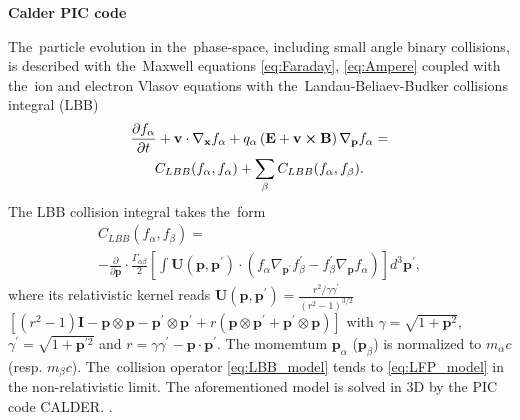 
\textbf{Calder PIC code}

The~particle evolution in the~phase-space, including small angle 
binary collisions, is described with 
the~Maxwell equations \eqref{eq:Faraday}, \eqref{eq:Ampere}
coupled with the~ion and electron Vlasov equations with 
the~Landau-Beliaev-Budker collisions integral (LBB)
\cite{Landau_1936, Beliaev_SPD1956} 
\begin{multline}
\frac{\partial f_\alpha}{\partial t}+\mathbf{v}\cdot\nabla_{\mathbf{x}}f_\alpha+q_\alpha\left(\mathbf{E}+\mathbf{v}\boldsymbol{\times}\mathbf{B}\right)\nabla_{\mathbf{p}}f_\alpha =
\\
C_{LBB}(f_\alpha,f_\alpha)+\sum_\beta C_{LBB}(f_\alpha,f_\beta)
.
\end{multline}
The LBB collision integral takes the~form
\begin{multline}
C_{LBB}(f_\alpha,f_\beta)=
\\
-\frac{\partial}{\partial \mathbf{p}}\cdot\frac{\Gamma_{\alpha\beta}}{2}\left[\int \mathbf{U}(\mathbf{p},\mathbf{p}^\prime)\cdot(f_\alpha\nabla_{\mathbf{p}^\prime}f_\beta^\prime-f_\beta^\prime\nabla_{\mathbf{p}}f_\alpha)\right]d^3\mathbf{p}^\prime
,
\label{eq:LBB_model}
\end{multline}
where its relativistic kernel reads
$\mathbf{U}(\mathbf{p},\mathbf{p}^\prime)=\frac{r^2/\gamma\gamma^\prime}{(r^2-1)^{3/2}}$ 
$\left[(r^2-1)\mathbf{I}-\mathbf{p}\otimes\mathbf{p}-\mathbf{p}^\prime\otimes\mathbf{p}^\prime+r(\mathbf{p}\otimes\mathbf{p}^\prime+\mathbf{p}^\prime\otimes\mathbf{p})\right]$
with $\gamma=\sqrt{1+\mathbf{p}^2}$, $\gamma^\prime=\sqrt{1+\mathbf{p}^{\prime 2}}$ and $r=\gamma\gamma^\prime-\mathbf{p}\cdot\mathbf{p}^\prime$. 
The momemtum $\mathbf{p}_\alpha$ ($\mathbf{p}_\beta$) is normalized to 
$m_\alpha c$ (resp. $m_\beta c$). The~collision operator \eqref{eq:LBB_model} 
tends to \eqref{eq:LFP_model} in the non-relativistic limit.
The aforementioned model is solved in 3D by the PIC code CALDER. 
\cite{Lefebvre_NF2003, Perez_PoP2012}.

